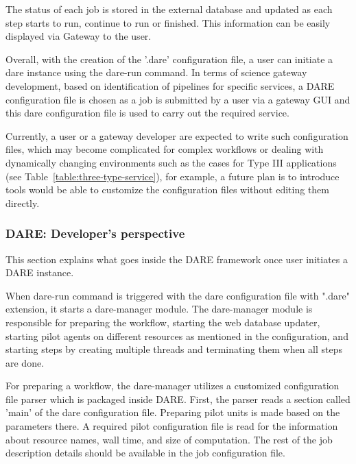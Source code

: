 \documentclass[]{svjour3}
\begin{document}
The status of each job is stored in the external database and updated as each step starts to run, continue to run or finished.  This information can be easily displayed via Gateway to the user.  

Overall, with the creation of the '.dare' configuration file, a user can initiate a dare instance using the dare-run command.  In terms of science gateway development, based on identification of pipelines for specific services, a DARE configuration file is chosen as a job is submitted by a user via a gateway GUI and this dare configuration file is used to carry out the required service.

Currently, a user or a gateway developer are expected to write such configuration files, which may become complicated for complex workflows or dealing with dynamically changing environments such as the cases for Type III applications (see Table~\ref{table:three-type-service}), for example, a future plan is to introduce tools would be able to customize the configuration files without editing them directly.   

\subsubsection{DARE: Developer's perspective}



This section explains what goes inside the DARE framework once user initiates a 
DARE instance. 

When dare-run command is triggered with the dare configuration file
with ".dare" extension, it starts a dare-manager module.  The
dare-manager module is responsible for preparing the workflow,
starting the web database updater, starting pilot agents on different
resources as mentioned in the configuration, and starting steps by
creating multiple threads and terminating them when all steps are
done.

For preparing a workflow, the dare-manager utilizes a customized
configuration file parser which is packaged inside DARE.  First, the
parser reads a section called 'main' of the dare configuration file.
Preparing pilot units is made based on the parameters there.  A
required pilot configuration file is read for the information about
resource names, wall time, and size of computation.  The rest of the
job description details should be available in the job configuration
file.
\end{document}
